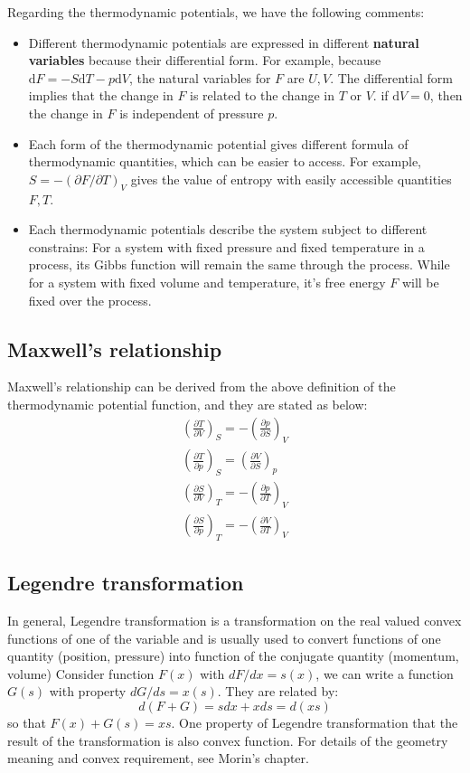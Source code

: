\documentclass{article}
\newcommand{\pfrac}[2]{\frac{\partial #1}{\partial #2}}
\newcommand{\dnor}{\text{d}}
\begin{document}
Regarding the thermodynamic potentials, we have the following comments:
\begin{itemize}
    \item Different thermodynamic potentials are expressed in different \textbf{natural variables} because 
            their differential form. For example, because $\dnor F = - S \dnor T - p \dnor V$, the natural variables for $F$ are $U, V$. 
            The differential form implies that the change in $F$ is related to the change in $T$ or $V$. if $\dnor V = 0$, then the change
            in $F$ is independent of pressure $p$. 
    \item Each form of the thermodynamic potential gives different formula of thermodynamic quantities, which can be easier to access. For 
            example, $S = -\left(\partial{F}/\partial{T}\right)_V$ gives the value of entropy with easily accessible quantities $F, T$.
    \item Each thermodynamic potentials describe the system subject to different constrains: For a system with fixed pressure and fixed temperature
            in a process, its Gibbs function will remain the same through the process. While for a system with fixed volume and temperature, 
            it's free energy $F$ will be fixed over the process.
\end{itemize}

\subsection{Maxwell's relationship}
Maxwell's relationship can be derived from the above  definition of the thermodynamic
potential function, and they are stated as below:
\begin{gather}
    \left(\pfrac{T}{V}\right)_S = - \left(\pfrac{p}{S}\right)_V \\
    \left(\pfrac{T}{p}\right)_S = \left(\pfrac{V}{S}\right)_p \\
    \left(\pfrac{S}{V}\right)_T = - \left(\pfrac{p}{T}\right)_V \\
    \left(\pfrac{S}{p}\right)_T = - \left(\pfrac{V}{T}\right)_V 
\end{gather}

\subsection{Legendre transformation}
In general, Legendre transformation is a transformation on the real valued convex functions
of one of the variable and is usually used to convert functions of one quantity (position, pressure) into function of
the conjugate quantity (momentum, volume)
Consider function $F(x)$ with $dF/dx = s(x)$, we can write a function
$G(s)$ with property $dG/ds = x(s)$. They are related by:
\begin{equation}
    d(F+G) = sdx + xds = d(xs)
\end{equation}
so that $F(x) + G(s) = xs$. One property of Legendre transformation that the result of the transformation 
is also convex function. For details of the geometry meaning and convex requirement, see Morin's chapter.
\end{document}
